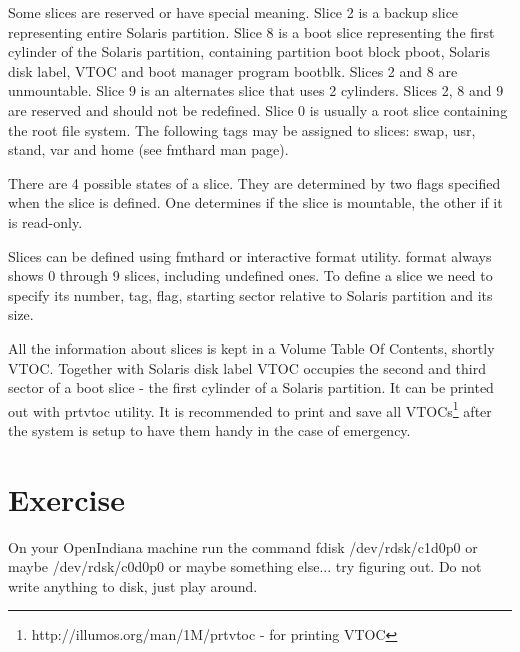 \documentclass{article}
\begin{document}
Some slices are reserved or have special meaning. Slice 2 is a backup slice
representing entire Solaris partition. Slice 8 is a boot slice representing the
first cylinder of the Solaris partition, containing partition boot block pboot,
Solaris disk label, VTOC and boot manager program bootblk. Slices 2 and 8 are
unmountable. Slice 9 is an alternates slice that uses 2 cylinders. Slices 2, 8
and 9 are reserved and should not be redefined. Slice 0 is usually a root slice
containing the root file system. The following tags may be assigned to slices:
swap, usr, stand, var and home (see fmthard man page).

There are 4 possible states of a slice. They are determined by two flags
specified when the slice is defined. One determines if the slice is mountable,
the other if it is read-only.

Slices can be defined using fmthard or interactive format utility. format always
shows 0 through 9 slices, including undefined ones. To define a slice we need to
specify its number, tag, flag, starting sector relative to Solaris partition and
its size.

All the information about slices is kept in a Volume Table Of Contents, shortly
VTOC. Together with Solaris disk label VTOC occupies the second and third sector
of a boot slice - the first cylinder of a Solaris partition. It can be printed
out with prtvtoc utility. It is recommended to print and save all
VTOCs\footnote{http://illumos.org/man/1M/prtvtoc - for printing VTOC} after
the system is setup to have them handy in the case of emergency.

\section*{Exercise}
On your OpenIndiana machine run the command fdisk /dev/rdsk/c1d0p0 or maybe
/dev/rdsk/c0d0p0 or maybe something else... try figuring out. Do not write
anything to disk, just play around.
\end{document}
